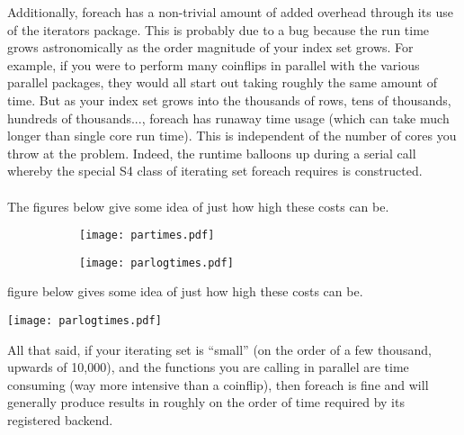 %
Additionally, foreach has a non-trivial amount of added overhead through its use of the iterators package.  This is probably due to a bug because the run time grows astronomically as the order magnitude of your index set grows.  For example, if you were to perform many coinflips in parallel with the various parallel packages, they would all start out taking roughly the same amount of time.  But as your index set grows into the thousands of rows, tens of thousands, hundreds of thousands..., foreach has runaway time usage (which can take much longer than single core run time).  This is independent of the number of cores you throw at the problem.  Indeed, the runtime balloons up during a serial call whereby the special S4 class of iterating set foreach requires is constructed.\\\\
%
The 
\ifpdf
figures below give some idea of just how high these costs can be.
\begin{figure}[h]
  \begin{subfigure}[b]{0.5\textwidth}
    \centering
    \texttt{[image: partimes.pdf]}
  \end{subfigure}%
  \begin{subfigure}[b]{0.5\textwidth}
    \centering
    \texttt{[image: parlogtimes.pdf]}
  \end{subfigure}%
\end{figure}
\else
figure below gives some idea of just how high these costs can be.
  \begin{center}
   \texttt{[image: parlogtimes.pdf]}
  \end{center}
\fi

%
All that said, if your iterating set is ``small'' (on the order of a few thousand, upwards of 10,000), and the functions you are calling in parallel are time consuming (way more intensive than a coinflip), then foreach is fine and will generally produce results in roughly on the order of time required by its registered backend.


